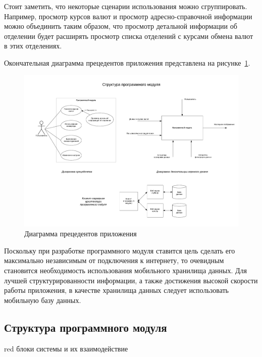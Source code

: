 Стоит заметить, что некоторые сценарии использования можно сгруппировать.
Например, просмотр курсов валют и просмотр адресно-справочной информации можно
объединить таким образом, что просмотр детальной информации об отделении будет
расширять просмотр списка отделений с курсами обмена валют в этих отделениях.

Окончательная диаграмма прецедентов приложения
представлена на рисунке~\ref{fig:use_case}.
\begin{figure}[h!]
  \centering
  \includegraphics[width=140mm]{fig/use_case}
  \caption{Диаграмма прецедентов приложения}
  \label{fig:use_case}
\end{figure}

Поскольку при разработке программного модуля ставится цель сделать его
максимально независимым от подключения к интернету, то очевидным становится
необходимость использования мобильного хранилища данных. Для лучшей
структурированности информации, а также достижения высокой скорости работы приложения,
в качестве хранилища данных следует использовать мобильную базу данных.

\pagebreak



\subsection{Структура программного модуля}

\begin{color}{red}
блоки системы и их взаимодействие
\end{color}

\newpage


